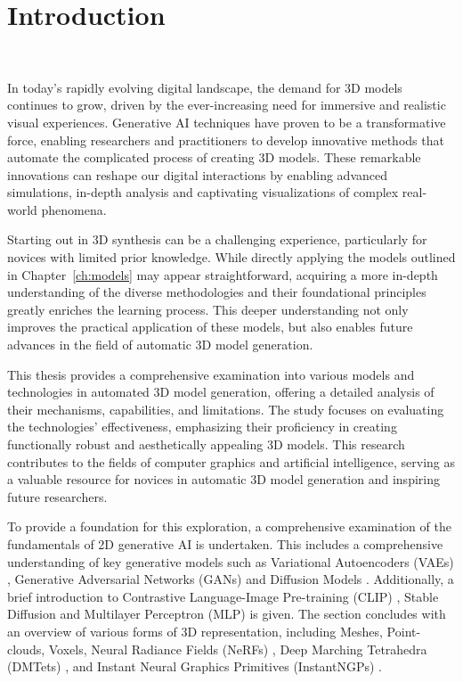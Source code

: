 \chapter{Introduction}~\label{ch:introduction}

In today's rapidly evolving digital landscape, the demand for 3D models continues to grow, driven by the ever-increasing need for immersive and realistic visual experiences. Generative AI techniques have proven to be a transformative force, enabling researchers and practitioners to develop innovative methods that automate the complicated process of creating 3D models. These remarkable innovations can reshape our digital interactions by enabling advanced simulations, in-depth analysis and captivating visualizations of complex real-world phenomena.

Starting out in 3D synthesis can be a challenging experience, particularly for novices with limited prior knowledge. While directly applying the models outlined in Chapter~\ref{ch:models} may appear straightforward, acquiring a more in-depth understanding of the diverse methodologies and their foundational principles greatly enriches the learning process. This deeper understanding not only improves the practical application of these models, but also enables future advances in the field of automatic 3D model generation.

This thesis provides a comprehensive examination into various models and technologies in automated 3D model generation, offering a detailed analysis of their mechanisms, capabilities, and limitations. The study focuses on evaluating the technologies' effectiveness, emphasizing their proficiency in creating functionally robust and aesthetically appealing 3D models. This research contributes to the fields of computer graphics and artificial intelligence, serving as a valuable resource for novices in automatic 3D model generation and inspiring future researchers.

To provide a foundation for this exploration, a comprehensive examination of the fundamentals of 2D generative AI is undertaken. This includes a comprehensive understanding of key generative models such as Variational Autoencoders (VAEs) \citep{kingmaVAE,rezendeVAE}, Generative Adversarial Networks (GANs) \citep{goodfellowGAN} and Diffusion Models \citep{yangdiffusionSummary,hoDDPMs, sohlDDPM}. Additionally, a brief introduction to Contrastive Language-Image Pre-training (CLIP) \citep{radfordCLIP}, Stable Diffusion \citep{rombachStableDiffusion} and Multilayer Perceptron (MLP) is given. The section concludes with an overview of various forms of 3D representation, including Meshes, Point-clouds, Voxels, Neural Radiance Fields (NeRFs) \citep{mildenhallNERF}, Deep Marching Tetrahedra (DMTets) \citep{shen2021DMTet}, and Instant Neural Graphics Primitives (InstantNGPs) \citep{M_ller_2022}.

